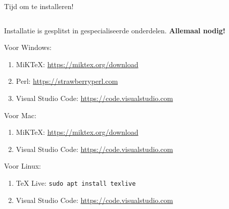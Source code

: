 \begin{frame}{Tijd om te installeren!}
    \begin{columns}
        \begin{column}{0.4\textwidth}
            \tiny

            Installatie is gesplitst in gespecialiseerde onderdelen. \textbf{Allemaal
            nodig!}
            \medskip

            Voor Windows:
            \begin{enumerate}[label=\arabic*), itemsep=0pt]
                \item MiKTeX: \url{https://miktex.org/download}
                \item Perl: \url{https://strawberryperl.com}
                \item Visual Studio Code: \url{https://code.visualstudio.com}
            \end{enumerate}

            Voor Mac:
            \begin{enumerate}[label=\arabic*), itemsep=0pt]
                \item MiKTeX: \url{https://miktex.org/download}
                \item Visual Studio Code: \url{https://code.visualstudio.com}
            \end{enumerate}

            Voor Linux:
            \begin{enumerate}[label=\arabic*), itemsep=0pt]
                \item TeX Live: \texttt{sudo apt install texlive}
                \item Visual Studio Code: \url{https://code.visualstudio.com}
            \end{enumerate}


\end{column}
\end{columns}
\end{frame}

